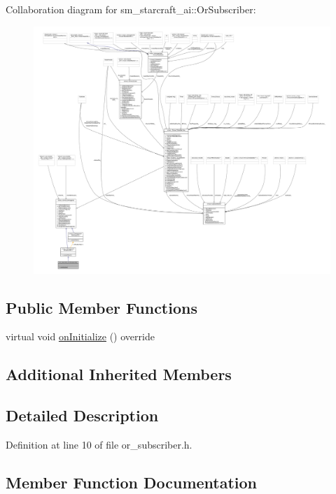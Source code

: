Collaboration diagram for sm\+\_\+starcraft\+\_\+ai\+:\+:Or\+Subscriber\+:
\nopagebreak
\begin{figure}[H]
\begin{center}
\leavevmode
\includegraphics[width=350pt]{classsm__starcraft__ai_1_1OrSubscriber__coll__graph}
\end{center}
\end{figure}
\subsection*{Public Member Functions}
\begin{DoxyCompactItemize}
\item 
virtual void \hyperlink{classsm__starcraft__ai_1_1OrSubscriber_a6c50b70cd03e31c6c87a80eca9510c05}{on\+Initialize} () override
\end{DoxyCompactItemize}
\subsection*{Additional Inherited Members}


\subsection{Detailed Description}


Definition at line 10 of file or\+\_\+subscriber.\+h.



\subsection{Member Function Documentation}
